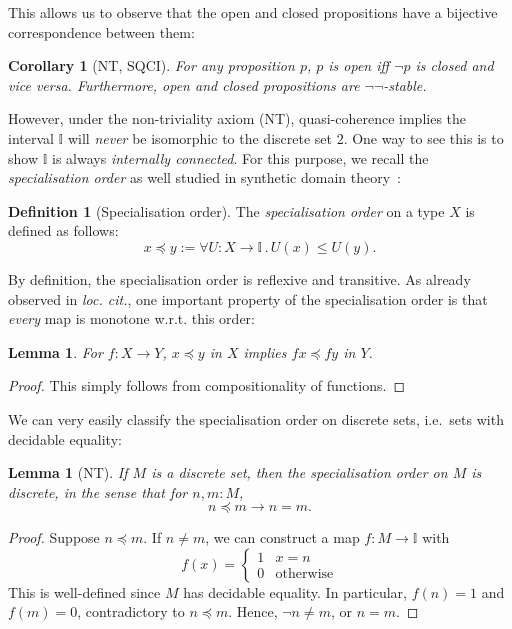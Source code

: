 \documentclass[12pt]{amsart}
\newtheorem{lemma}[theorem]{Lemma}
\newtheorem{corollary}[theorem]{Corollary}
\theoremstyle{definition}
\newtheorem{definition}[theorem]{Definition}
\newcommand{\mbb}[1]{\mathbb{#1}}
\newcommand{\I}{\mbb I}
\newcommand{\other}{\mathrm{otherwise}}
\newcommand{\dneg}{\neg\neg}
\newcommand{\fa}[2]{\forall #1\!\colon\!\!#2\mathpunct{.}}
\begin{document}
This allows us to observe that the open and closed propositions have a bijective correspondence between them:

\begin{corollary}[NT, SQCI]\label{cor:opendnegclose}
  For any proposition $p$, $p$ is open iff $\neg p$ is closed and vice versa. Furthermore, open and closed propositions are $\dneg$-stable.
\end{corollary}

However, under the non-triviality axiom (NT), quasi-coherence implies the interval $\I$ will \emph{never} be isomorphic to the discrete set $2$. One way to see this is to show $\I$ is always \emph{internally connected}. For this purpose, we recall the \emph{specialisation order} as well studied in synthetic domain theory~\cite{PhoaWesleyKym-Son1991DtiR}:

\begin{definition}[Specialisation order]\label{defn:specialisation}
  The \emph{specialisation order} on a type $X$ is defined as follows:
  \[ x \preceq y := \fa{U}{X\to\I} U(x) \le U(y). \]
\end{definition}

By definition, the specialisation order is reflexive and transitive. As already observed in \emph{loc. cit.}, one important property of the specialisation order is that \emph{every} map is monotone w.r.t. this order:

\begin{lemma}\label{lem:anymapmonotoneintriscorder}
  For $f : X \to Y$, $x \preceq y$ in $X$ implies $fx \preceq fy$ in $Y$.
\end{lemma}
\begin{proof}
  This simply follows from compositionality of functions.
\end{proof}


We can very easily classify the specialisation order on discrete sets, i.e.\ sets with decidable equality:

\begin{lemma}[NT]\label{lem:discretephoa}
  If $M$ is a discrete set, then the specialisation order on $M$ is discrete, in the sense that for $n,m : M$,
  \[ n \preceq m \to n = m. \]
\end{lemma}
\begin{proof}
  Suppose $n \preceq m$. If $n \neq m$, we can construct a map $f : M \to \I$ with 
  \[ f(x) =
  \begin{cases}
    1 & x = n \\ 
    0 & \other
  \end{cases}
  \]
  This is well-defined since $M$ has decidable equality. In particular, $f(n) = 1$ and $f(m) = 0$, contradictory to $n \preceq m$. Hence, $\neg n \neq m$, or $n = m$.
\end{proof}
\end{document}
